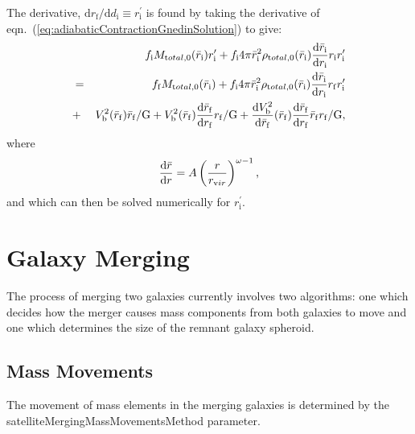 The derivative, ${\mathrm d} r_{\mathrm f}/{\mathrm d}d_{\mathrm i}\equiv r^\prime_{\mathrm i}$ is found by taking the derivative of eqn.~(\ref{eq:adiabaticContractionGnedinSolution}) to give:
\begin{eqnarray}
 &   & f_{\mathrm i} M_{\mathrm total,0}(\bar{r}_{\mathrm i}) r^\prime_{\mathrm i} + f_{\mathrm i} 4 \pi \bar{r}_{\mathrm i}^2 \rho_{\mathrm total,0}(\bar{r}_{\mathrm i}) {{\mathrm d} \bar{r}_{\mathrm i}\over{\mathrm d} r_{\mathrm i}} r_{\mathrm i} r^\prime_{\mathrm i} \nonumber \\
 & = & f_{\mathrm f} M_{\mathrm total,0}(\bar{r}_{\mathrm i}) +  f_{\mathrm i} 4 \pi \bar{r}_{\mathrm i}^2 \rho_{\mathrm total,0}(\bar{r}_{\mathrm i}) {{\mathrm d} \bar{r}_{\mathrm i}\over{\mathrm d} r_{\mathrm i}} r_{\mathrm f} r^\prime_{\mathrm i} \nonumber \\
 & + & V^2_{\mathrm b}(\bar{r}_{\mathrm f}) \bar{r}_{\mathrm f} / {\mathrm G} +  V^2_{\mathrm b}(\bar{r}_{\mathrm f}) {{\mathrm d}\bar{r}_{\mathrm f}\over {\mathrm d} r_{\mathrm f}} r_{\mathrm f}/ {\mathrm G} +  {{\mathrm d}V^2_{\mathrm b}\over{\mathrm d} \bar{r}_{\mathrm f}}(\bar{r}_{\mathrm f}) {{\mathrm d}\bar{r}_{\mathrm f}\over {\mathrm d} r_{\mathrm f}} \bar{r}_{\mathrm f} r_{\mathrm f}/ {\mathrm G},
\end{eqnarray}
where
\begin{equation}
 {{\mathrm d}\bar{r} \over {\mathrm d} r} = A \left({r \over r_{\mathrm vir}}\right)^{\omega-1},
\end{equation}
and which can then be solved numerically for $r^\prime_{\mathrm i}$.

\section{Galaxy Merging}

The process of merging two galaxies currently involves two algorithms: one which decides how the merger causes mass components from both galaxies to move and one which determines the size of the remnant galaxy spheroid.

\subsection{Mass Movements}\label{sec:MergingMassMovements}

The movement of mass elements in the merging galaxies is determined by the {\normalfont \ttfamily satelliteMergingMassMovementsMethod} parameter. 

